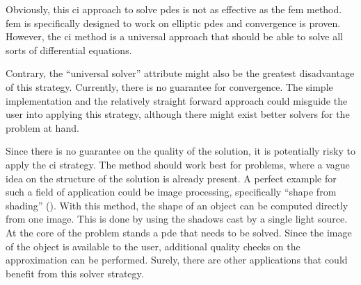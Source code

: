 \documentclass[./\jobname.tex]{subfiles}
\begin{document}
Obviously, this \gls{ci} approach to solve \gls{pde}s is not as effective as the \gls{fem} method. \gls{fem} is specifically designed to work on elliptic \gls{pde}s and convergence is proven. However, the \gls{ci} method is a universal approach that should be able to solve all sorts of differential equations. 

Contrary, the ``universal solver'' attribute might also be the greatest disadvantage of this strategy. Currently, there is no guarantee for convergence. The simple implementation and the relatively straight forward approach could misguide the user into applying this strategy, although there might exist better solvers for the problem at hand. 

Since there is no guarantee on the quality of the solution, it is potentially risky to apply the \gls{ci} strategy. The method should work best for problems, where a vague idea on the structure of the solution is already present. A perfect example for such a field of application could be image processing, specifically ``shape from shading'' (\cite{horn_shape_1970}). With this method, the shape of an object can be computed directly from one image. This is done by using the shadows cast by a single light source. At the core of the problem stands a \gls{pde} that needs to be solved. Since the image of the object is available to the user, additional quality checks on the approximation can be performed. Surely, there are other applications that could benefit from this solver strategy. 
\end{document}
